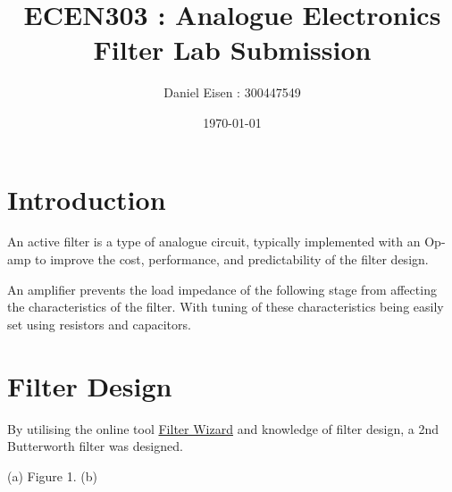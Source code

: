 \documentclass[11pt]{article}
\title{ECEN303 : Analogue Electronics \\ Filter Lab Submission}
\author{Daniel Eisen : 300447549}
\date{\today}
\begin{document}
\begin{preview}
\maketitle
\section*{Introduction}
An active filter is a type of analogue circuit, typically implemented with an Op-amp to improve the cost, performance, and predictability of the filter design.

An amplifier prevents the load impedance of the following stage from affecting the characteristics of the filter. With tuning of these characteristics being easily set using resistors and capacitors. 
\section{Filter Design}
By utilising the online tool \href{https://tools.analog.com/en/filterwizard/}{Filter Wizard} and knowledge of filter design, a 2nd Butterworth filter was designed. 

\begin{center}
        (a) \hspace*{0.2\textwidth} Figure 1. \hspace*{0.2\textwidth} (b)
\end{center}


\end{preview}
\end{document}
